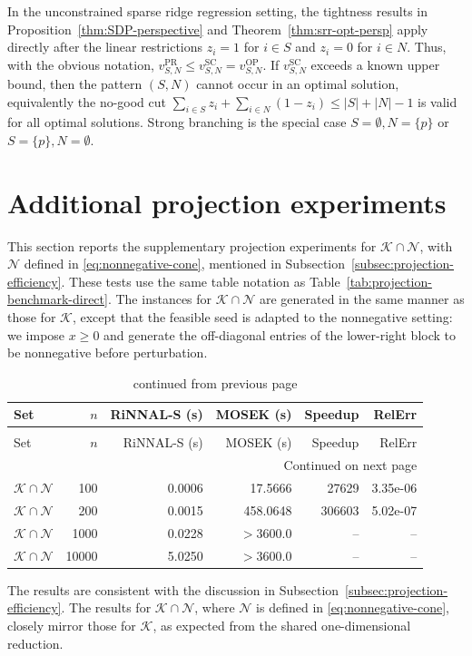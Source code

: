 \documentclass[11pt]{article}
\def\K{\mathcal{K}}
\theoremstyle{plain}
\begin{document}
In the unconstrained sparse ridge regression setting, the tightness results in Proposition~\ref{thm:SDP-perspective} and Theorem~\ref{thm:srr-opt-persp} apply directly after the linear restrictions $z_i=1$ for $i\in S$ and $z_i=0$ for $i\in N$. Thus, with the obvious notation, $v^{\mathrm{PR}}_{S,N}\le v^{\mathrm{SC}}_{S,N}=v^{\mathrm{OP}}_{S,N}$. If $v^{\mathrm{SC}}_{S,N}$ exceeds a known upper bound, then the pattern $(S,N)$ cannot occur in an optimal solution, equivalently the no-good cut $\sum_{i\in S}z_i+\sum_{i\in N}(1-z_i)\le |S|+|N|-1$ is valid for all optimal solutions. Strong branching is the special case $S=\emptyset,N=\{p\}$ or $S=\{p\},N=\emptyset$.

\section{Additional projection experiments}\label{app:additional-projection}

This section reports the supplementary projection experiments for $\K\cap\mathcal N$, with \(\mathcal N\) defined in \eqref{eq:nonnegative-cone}, mentioned in Subsection~\ref{subsec:projection-efficiency}. These tests use the same table notation as Table~\ref{tab:projection-benchmark-direct}. The instances for $\K\cap\mathcal{N}$ are generated in the same manner as those for $\K$, except that the feasible seed is adapted to the nonnegative setting: we impose $x\geq 0$ and generate the off-diagonal entries of the lower-right block to be nonnegative before perturbation.

\small
\begin{longtable}{lrrrrr}
\caption{Additional projection results on $\K\cap\mathcal{N}$.}
\label{tab:projection-benchmark-additional}\\
\toprule
Set & $n$ & RiNNAL-S (s) & MOSEK (s) & Speedup & RelErr \\
\midrule
\endfirsthead
\caption[]{continued from previous page}\\
\toprule
Set & $n$ & RiNNAL-S (s) & MOSEK (s) & Speedup & RelErr \\
\midrule
\endhead
\midrule
\multicolumn{6}{r}{Continued on next page}\\
\endfoot
\bottomrule
\endlastfoot
$\K\cap\mathcal{N}$ & 100   & 0.0006 & 17.5666  & 27629    & 3.35e-06 \\
$\K\cap\mathcal{N}$ & 200   & 0.0015 & 458.0648 & 306603   & 5.02e-07 \\
$\K\cap\mathcal{N}$ & 1000  & 0.0228 & $>3600.0$  & --       & -- \\
$\K\cap\mathcal{N}$ & 10000 & 5.0250 & $>3600.0$  & --       & -- \\
\end{longtable}
\normalsize

The results are consistent with the discussion in Subsection~\ref{subsec:projection-efficiency}. The results for $\K\cap\mathcal N$, where \(\mathcal N\) is defined in \eqref{eq:nonnegative-cone}, closely mirror those for $\K$, as expected from the shared one-dimensional reduction.
\end{document}
